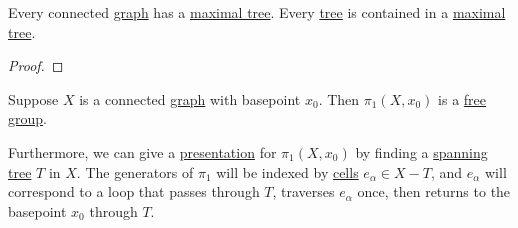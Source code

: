 \begin{theorem}
	Every connected \hyperref[def:graph]{graph} has a \hyperref[def:maximal-tree]{maximal tree}.
	Every \hyperref[def:tree]{tree} is contained in a \hyperref[def:maximal-tree]{maximal tree}.
\end{theorem}
\begin{proof}
\end{proof}
\begin{corollary}
	Suppose \(X\) is a connected \hyperref[def:graph]{graph} with basepoint \(x_0\). Then \(\pi _1(X, x_0)\) is a
	\hyperref[def:free-group]{free group}.

	\par Furthermore, we can give a \hyperref[def:group-presentation]{presentation} for \(\pi _1(X, x_0)\) by finding a
	\hyperref[def:maximal-tree]{spanning tree} \(T\) in \(X\). The generators of
	\(\pi _1\) will be indexed by \hyperref[def:cell]{cells} \(e_\alpha \in X-T\), and \(e_\alpha \) will correspond to a loop that passes through \(T\),
	traverses \(e_\alpha \) once, then returns to the basepoint \(x_0\) through \(T\).
\end{corollary}
